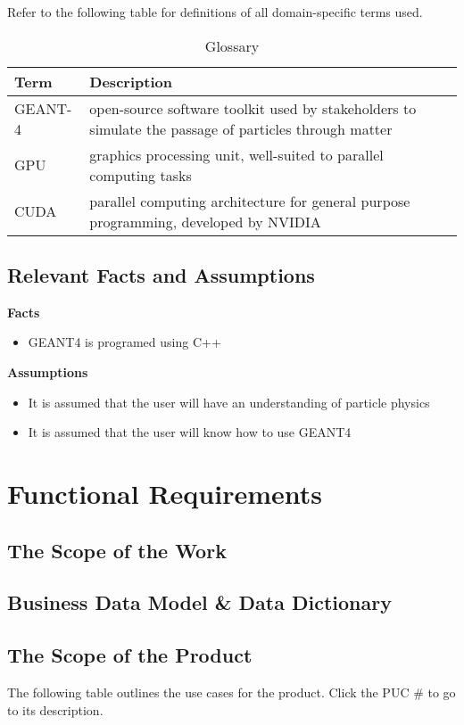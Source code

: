 \documentclass[12pt]{article}
\begin{document}
Refer to the following table for definitions of all domain-specific terms used.\\

\begin{table}[h]
\centering
\begin{tabularx}{\textwidth}{lX}
\hline
Term & Description\\
\hline
GEANT-4 & open-source software toolkit used by stakeholders to simulate the passage of particles through matter\\
GPU & graphics processing unit, well-suited to parallel computing tasks\\
CUDA & parallel computing architecture for general purpose programming, developed by NVIDIA\\
\hline
\end{tabularx}
\caption{Glossary}
\end{table}

\subsection{Relevant Facts and Assumptions} %
\textbf{Facts}
\begin{itemize}
	\item GEANT4 is programed using C++
\end{itemize}
\textbf{Assumptions}
 \begin{itemize}
	\item It is assumed that the user will have an understanding of particle physics
	\item It is assumed that the user will know how to use GEANT4
\end{itemize}
\section{Functional Requirements}
\subsection{The Scope of the Work} %
\subsection{Business Data Model \& Data Dictionary} %

\subsection{The Scope of the Product}
The following table outlines the use cases for the product. Click the PUC \# to go to its description.
\end{document}
